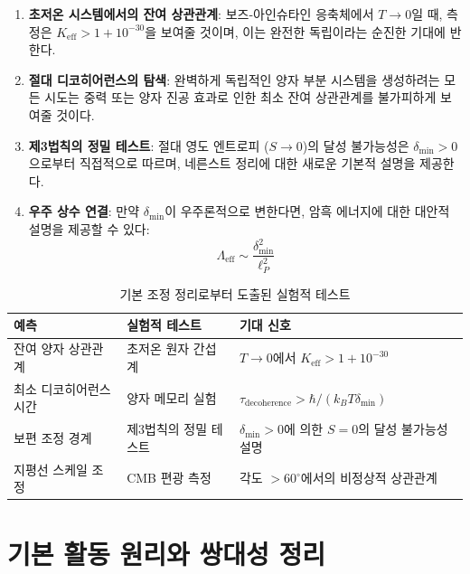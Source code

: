 \documentclass[11pt,a4paper]{article}
\begin{document}
\begin{enumerate}
\item \textbf{초저온 시스템에서의 잔여 상관관계}: 보즈-아인슈타인 응축체에서 $T \to 0$일 때, 측정은 $K_{\mathrm{eff}} > 1 + 10^{-30}$을 보여줄 것이며, 이는 완전한 독립이라는 순진한 기대에 반한다.

\item \textbf{절대 디코히어런스의 탐색}: 완벽하게 독립적인 양자 부분 시스템을 생성하려는 모든 시도는 중력 또는 양자 진공 효과로 인한 최소 잔여 상관관계를 불가피하게 보여줄 것이다.

\item \textbf{제3법칙의 정밀 테스트}: 절대 영도 엔트로피 ($S \to 0$)의 달성 불가능성은 $\delta_{\min} > 0$으로부터 직접적으로 따르며, 네른스트 정리에 대한 새로운 기본적 설명을 제공한다.

\item \textbf{우주 상수 연결}: 만약 $\delta_{\min}$이 우주론적으로 변한다면, 암흑 에너지에 대한 대안적 설명을 제공할 수 있다:
\begin{equation}
	\Lambda_{\mathrm{eff}} \sim \frac{\delta_{\min}^2}{\ell_P^2}
\end{equation}
\end{enumerate}

\begin{table}[htbp]
\centering
\small
\begin{tabular}{p{}p{}p{}}
	\toprule
	\textbf{예측} & \textbf{실험적 테스트} & \textbf{기대 신호} \\
	\midrule
	잔여 양자 상관관계 & 초저온 원자 간섭계 & $T \to 0$에서 $K_{\mathrm{eff}} > 1 + 10^{-30}$ \\
	최소 디코히어런스 시간 & 양자 메모리 실험 & $\tau_{\text{decoherence}} > \hbar/(k_B T \delta_{\min})$ \\
	보편 조정 경계 & 제3법칙의 정밀 테스트 & $\delta_{\min}>0$에 의한 $S=0$의 달성 불가능성 설명 \\
	지평선 스케일 조정 & CMB 편광 측정 & 각도 $>60^\circ$에서의 비정상적 상관관계 \\
	\bottomrule
\end{tabular}
\caption{기본 조정 정리로부터 도출된 실험적 테스트}
\label{tab:theorem-predictions}
\end{table}

\section{기본 활동 원리와 쌍대성 정리}
\label{sec:activity_principle}
\end{document}
